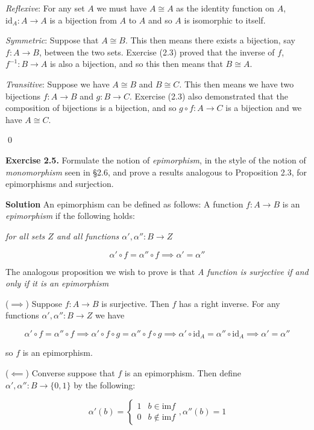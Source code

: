 \documentclass[titlepage]{article}
\begin{document}
\textit{Reflexive}: For any set $A$ we must have $A \cong A$ as the identity function on $A$, $\text{id}_A:A \to A$ is a bijection from $A$ to $A$ and so $A$ is isomorphic to itself.

\textit{Symmetric}: Suppose that $A \cong B$. This then means there exists a bijection, say $f:A \to B$, between the two sets. Exercise (2.3) proved that the inverse of $f$, $f^{-1}:B \to A$ is also a bijection, and so this then means that $B \cong A$.

\textit{Transitive}: Suppose we have $A \cong B$ and $B \cong C$. This then means we have two bijections $f:A \to B$ and $g:B \to C$. Exercise (2.3) also demonstrated that the composition of bijections is a bijection, and so $g \circ f:A \to C$ is a bijection and we have $A \cong C$.

\qed

\bigskip

\textbf{Exercise 2.5.} Formulate the notion of \textit{epimorphism}, in the style of the notion of \textit{monomorphism} seen in \S 2.6, and prove a results analogous to Proposition 2.3, for epimorphisms and surjection.

\medskip

\textbf{Solution} An epimorphism can be defined as follows: A function $f:A \to B$ is an \textit{epimorphism} if the following holds:

\begin{center}
\textit{for all sets $Z$ and all functions $\alpha ',\alpha '': B \to Z$}

\[ \alpha ' \circ f = \alpha '' \circ f \implies \alpha ' = \alpha '' \]
\end{center}

The analogous proposition we wish to prove is that \textit{A function is surjective if and only if it is an epimorphism}

($\implies$) Suppose $f:A \to B$ is surjective. Then $f$ has a right inverse. For any functions $\alpha ',\alpha '': B \to Z$ we have

\[ \alpha ' \circ f = \alpha '' \circ f \implies \alpha ' \circ f \circ g = \alpha '' \circ f \circ g \implies \alpha ' \circ \text{id}_A = \alpha '' \circ \text{id}_A \implies \alpha ' = \alpha '' \]

so $f$ is an epimorphism.

($\impliedby$) Converse suppose that $f$ is an epimorphism. Then define $\alpha ', \alpha '': B \to \{0,1\}$ by the following:

\[ \alpha '(b) = \begin{cases}
1 & b \in \text{im} f \\ 0 & b \notin \text{im} f
\end{cases}, \alpha '' (b) = 1 \]
\end{document}

